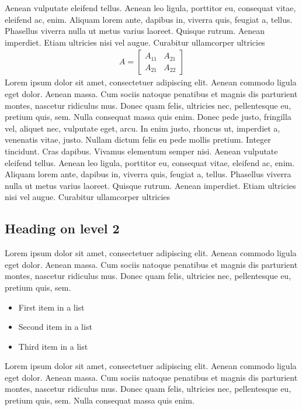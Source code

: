\documentclass[12pt]{article}
\begin{document}
Aenean vulputate eleifend tellus. Aenean leo ligula, porttitor eu, consequat vitae, eleifend ac, enim. Aliquam lorem ante, dapibus in, viverra quis, feugiat a, tellus. Phasellus viverra nulla ut metus varius laoreet. Quisque rutrum. Aenean imperdiet. Etiam ultricies nisi vel augue. Curabitur ullamcorper ultricies 
\begin{align}
        A = 
        \begin{bmatrix}
        A_{11} & A_{21} \\
        A_{21} & A_{22}
        \end{bmatrix}
\end{align}
Lorem ipsum dolor sit amet, consectetuer adipiscing elit. Aenean commodo ligula eget dolor. Aenean massa. Cum sociis natoque penatibus et magnis dis parturient montes, nascetur ridiculus mus. Donec quam felis, ultricies nec, pellentesque eu, pretium quis, sem. Nulla consequat massa quis enim. Donec pede justo, fringilla vel, aliquet nec, vulputate eget, arcu. In enim justo, rhoncus ut, imperdiet a, venenatis vitae, justo. Nullam dictum felis eu pede mollis pretium. Integer tincidunt. Cras dapibus. Vivamus elementum semper nisi. Aenean vulputate eleifend tellus. Aenean leo ligula, porttitor eu, consequat vitae, eleifend ac, enim. Aliquam lorem ante, dapibus in, viverra quis, feugiat a, tellus. Phasellus viverra nulla ut metus varius laoreet. Quisque rutrum. Aenean imperdiet. Etiam ultricies nisi vel augue. Curabitur ullamcorper ultricies 

\subsection*{Heading on level 2}
Lorem ipsum dolor sit amet, consectetuer adipiscing elit. Aenean commodo ligula eget dolor. Aenean massa. Cum sociis natoque penatibus et magnis dis parturient montes, nascetur ridiculus mus. Donec quam felis, ultricies nec, pellentesque eu, pretium quis, sem. 
\begin{itemize}
        \item First item in a list 
        \item Second item in a list 
        \item Third item in a list
\end{itemize}
Lorem ipsum dolor sit amet, consectetuer adipiscing elit. Aenean commodo ligula eget dolor. Aenean massa. Cum sociis natoque penatibus et magnis dis parturient montes, nascetur ridiculus mus. Donec quam felis, ultricies nec, pellentesque eu, pretium quis, sem. Nulla consequat massa quis enim. 
\end{document}
